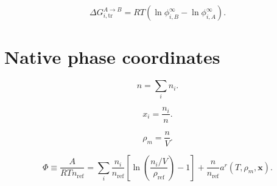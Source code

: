 \documentclass[11pt]{article}
\begin{document}
\begin{equation}
\Delta G_{i,\mathrm{tr}}^{A\rightarrow B}
=RT\left(\ln\phi_{i,B}^{\infty}-\ln\phi_{i,A}^{\infty}\right).
\label{eq:transfer_free_energy}
\end{equation}

\section{Native phase coordinates}

\begin{equation}
n=\sum_i n_i.
\label{eq:phase_total_amount}
\end{equation}

\begin{equation}
x_i=\frac{n_i}{n}.
\label{eq:phase_mole_fraction}
\end{equation}

\begin{equation}
\rho_m=\frac{n}{V}.
\label{eq:phase_molar_density}
\end{equation}

\begin{equation}
\Phi\equiv\frac{A}{RTn_{\mathrm{ref}}}
=\sum_i\frac{n_i}{n_{\mathrm{ref}}}
\left[
\ln\left(\frac{n_i/V}{\rho_{\mathrm{ref}}}\right)-1
\right]
+\frac{n}{n_{\mathrm{ref}}}a^r(T,\rho_m,\boldsymbol{x}).
\label{eq:phase_dimensionless_helmholtz}
\end{equation}
\end{document}
